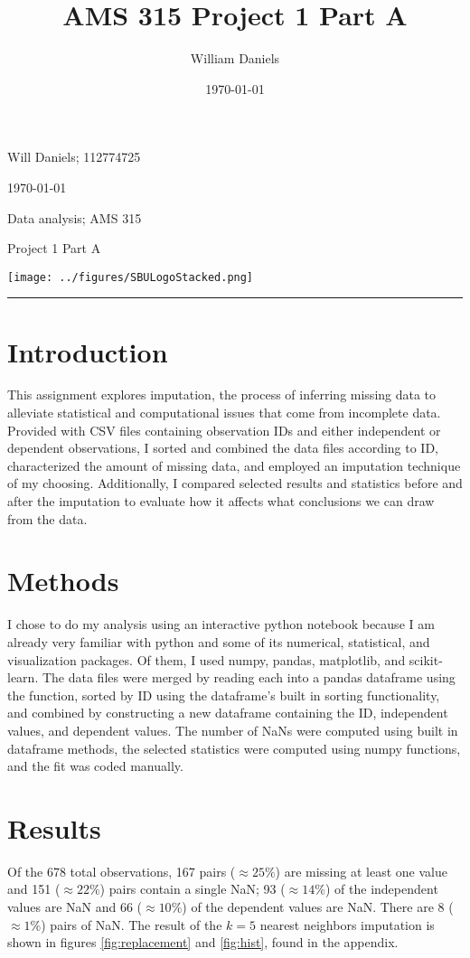 \documentclass[12pt, letterpaper]{article}
\title{AMS 315 Project 1 Part A}
\author{William Daniels}
\date{\today}
\begin{document}

\noindent
\begin{minipage}{0.7\textwidth}
    Will Daniels; 112774725

    \today

    Data analysis; AMS 315

    Project 1 Part A
\end{minipage}
%
\begin{minipage}{0.3\textwidth}
    \begin{flushright}
        \texttt{[image: ../figures/SBULogoStacked.png]}
    \end{flushright}
\end{minipage}
\noindent
\rule{\textwidth}{1pt}

\section*{Introduction}
This assignment explores imputation, the process of inferring missing data to alleviate statistical and computational issues that come from incomplete data.
Provided with CSV files containing observation IDs and either independent or dependent observations, I sorted and combined the data files according to ID, characterized the amount of missing data, and employed an imputation technique of my choosing.
Additionally, I compared selected results and statistics before and after the imputation to evaluate how it affects what conclusions we can draw from the data.

\section*{Methods}
I chose to do my analysis using an interactive python notebook because I am already very familiar with python and some of its numerical, statistical, and visualization packages.
Of them, I used numpy, pandas, matplotlib, and scikit-learn.
The data files were merged by reading each into a pandas dataframe using the  function, sorted by ID using the dataframe's built in sorting functionality, and combined by constructing a new dataframe containing the ID, independent values, and dependent values.
The number of NaNs were computed using built in dataframe methods, the selected statistics were computed using numpy functions, and the fit was coded manually.

\section*{Results}
Of the 678 total observations, 167 pairs (\(\approx25\%\)) are missing at least one value and 151 (\(\approx22\%\)) pairs contain a single NaN;
93 (\(\approx14\%\)) of the independent values are NaN and 66 (\(\approx10\%\)) of the dependent values are NaN.
There are 8 (\(\approx1\%\)) pairs of NaN.
The result of the \(k=5\) nearest neighbors imputation is shown in figures \ref{fig:replacement} and \ref{fig:hist}, found in the appendix.
\end{document}
